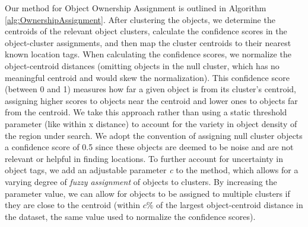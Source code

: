 Our method for Object Ownership Assignment is outlined in Algorithm \ref{alg:OwnershipAssignment}. 
After clustering the objects, we determine the centroids of the relevant object clusters, calculate the confidence scores in the object-cluster assignments, and then map the cluster centroids to their nearest known location tags. 
When calculating the confidence scores, we normalize the object-centroid distances (omitting objects in the null cluster, which has no meaningful centroid and would skew the normalization). 
This confidence score (between 0 and 1) measures how far a given object is from its cluster's centroid, assigning higher scores to objects near the centroid and lower ones to objects far from the centroid. 
We take this approach rather than using a static threshold parameter (like within x distance) to account for the variety in object density of the region under search. 
We adopt the convention of assigning null cluster objects a confidence score of 0.5 since these objects are deemed to be noise and are not relevant or helpful in finding locations.
To further account for uncertainty in object tags, we add an adjustable parameter \textit{c} to the method, which allows for a varying degree of \textit{fuzzy assignment} of objects to clusters. 
By increasing the parameter value, we can allow for objects to be assigned to multiple clusters if they are close to the centroid (within \textit{$c\%$} of the largest object-centroid distance in the dataset, the same value used to normalize the confidence scores). %

